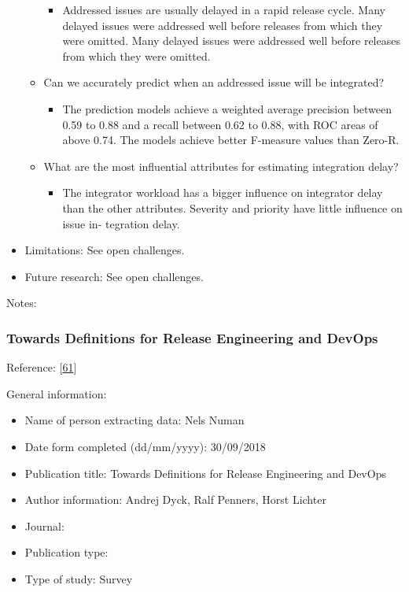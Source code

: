 \documentclass[]{book}
\providecommand{\tightlist}{%
  \setlength{\itemsep}{0pt}\setlength{\parskip}{0pt}}
\begin{document}
\begin{itemize}
\begin{itemize}
    \begin{itemize}
    \tightlist
    \item
      Addressed issues are usually delayed in a rapid release cycle.
      Many delayed issues were addressed well before releases from which
      they were omitted. Many delayed issues were addressed well before
      releases from which they were omitted.
    \end{itemize}
  \item
    Can we accurately predict when an addressed issue will be
    integrated?

    \begin{itemize}
    \tightlist
    \item
      The prediction models achieve a weighted average precision between
      0.59 to 0.88 and a recall between 0.62 to 0.88, with ROC areas of
      above 0.74. The models achieve better F-measure values than
      Zero-R.
    \end{itemize}
  \item
    What are the most influential attributes for estimating integration
    delay?

    \begin{itemize}
    \tightlist
    \item
      The integrator workload has a bigger influence on integrator delay
      than the other attributes. Severity and priority have little
      influence on issue in- tegration delay.
    \end{itemize}
  \end{itemize}
\item
  Limitations: See open challenges.
\item
  Future research: See open challenges.
\end{itemize}

Notes:

\subsubsection{Towards Definitions for Release Engineering and
DevOps}\label{towards-definitions-for-release-engineering-and-devops}

Reference: {[}\protect\hyperlink{ref-dyck2015a}{61}{]}

General information:

\begin{itemize}
\tightlist
\item
  Name of person extracting data: Nels Numan
\item
  Date form completed (dd/mm/yyyy): 30/09/2018
\item
  Publication title: Towards Definitions for Release Engineering and
  DevOps
\item
  Author information: Andrej Dyck, Ralf Penners, Horst Lichter
\item
  Journal:
\item
  Publication type:
\item
  Type of study: Survey
\end{itemize}
\end{document}
